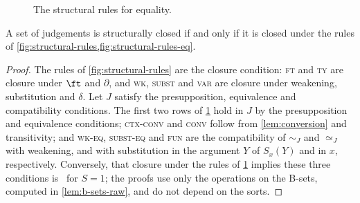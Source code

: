 \begin{figure}[ht]
    \caption{The structural rules for equality.}
    \label{fig:structural-rules-eq}
\end{figure}

\begin{proposition}\label{prop:structural-rules}
    A set of judgements is structurally closed if and only if it is closed under the rules of \cref{fig:structural-rules,fig:structural-rules-eq}.
\end{proposition}

\begin{proof}
    The rules of \cref{fig:structural-rules} are the closure condition: \textsc{ft} and \textsc{ty} are closure under $\ft$ and $\partial$, and \textsc{wk}, \textsc{subst} and \textsc{var} are closure under weakening, substitution and $\delta$. Let $J$ satisfy the presupposition, equivalence and compatibility conditions. The first two rows of \cref{fig:structural-rules-eq} hold in $J$ by the presupposition and equivalence conditions; \textsc{ctx-conv} and \textsc{conv} follow from \cref{lem:conversion} and transitivity; and \textsc{wk-eq}, \textsc{subst-eq} and \textsc{fun} are the compatibility of $\sim_J$ and $\simeq_J$ with weakening, and with substitution in the argument $Y$ of $S_x(Y)$ and in $x$, respectively. Conversely, that closure under the rules of \cref{fig:structural-rules-eq} implies these three conditions is~\cite[Prop.~6.2 and Lemma~6.3]{Voevodsky2014Module} for $S = 1$; the proofs use only the operations on the B-sets, computed in \cref{lem:b-sets-raw}, and do not depend on the sorts.
\end{proof}

